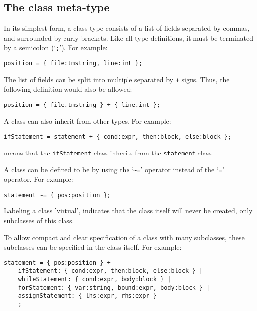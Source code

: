\subsection{The class meta-type}
In its simplest form, a class type consists of a list of fields separated
by commas, and surrounded by curly brackets.
Like all type definitions, it must be terminated by a semicolon (`\verb';'').
For example:
\begin{showfile}
\begin{verbatim}
position = { file:tmstring, line:int };
\end{verbatim}
\end{showfile}
The list of fields can be split into multiple  separated
by \verb'+' signs. Thus, the following definition would also be allowed:
\begin{showfile}
\begin{verbatim}
position = { file:tmstring } + { line:int };
\end{verbatim}
\end{showfile}
A class can also inherit from other types. 
For example:
\begin{showfile}
\begin{verbatim}
ifStatement = statement + { cond:expr, then:block, else:block };
\end{verbatim}
\end{showfile}
means that the \texttt{ifStatement} class inherits from the \texttt{statement}
class.
\par
A class can be defined to be  by using the `\verb'~=''
operator instead of the `\verb'='' operator. For example:
\begin{showfile}
\begin{verbatim}
statement ~= { pos:position };
\end{verbatim}
\end{showfile}
Labeling a class 'virtual', indicates that the class itself will
never be created, only subclasses of this class.
\par
To allow compact and clear specification of a class with many
subclasses, these subclasses can be specified in the class itself.
For example:
\begin{showfile}
\begin{verbatim}
statement = { pos:position } +
    ifStatement: { cond:expr, then:block, else:block } |
    whileStatement: { cond:expr, body:block } |
    forStatement: { var:string, bound:expr, body:block } |
    assignStatement: { lhs:expr, rhs:expr }
    ;
\end{verbatim}
\end{showfile}
